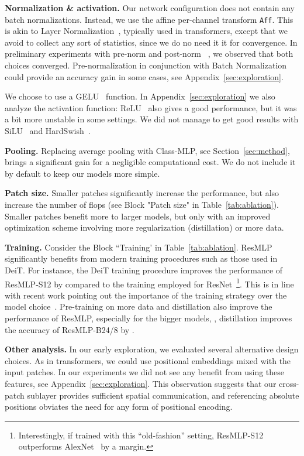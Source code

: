 \textbf{Normalization \& activation.}
Our network configuration does not contain any batch normalizations. 
Instead, we use the  affine per-channel transform \texttt{Aff}. 
This is akin to Layer Normalization~\cite{ba2016layer}, typically used in transformers, except that we avoid to collect any sort of statistics, since we do no need it it for convergence. 
In preliminary experiments with pre-norm and post-norm ~\cite{He2016IdentityMappings}, we observed that both choices converged.
Pre-normalization in conjunction with Batch Normalization could provide an accuracy gain in some cases, see Appendix~\ref{sec:exploration}.


We choose to use a GELU~\cite{Hendrycks2016GaussianEL} function. In Appendix~\ref{sec:exploration} we also analyze the activation function: 
ReLU~\cite{glorot11relu} also gives a good performance, but it was a bit more unstable in some settings. 
We did not manage to get good results with SiLU~\cite{Hendrycks2016GaussianEL} and HardSwish~\cite{Howard2019SearchingFM}. 

\textbf{Pooling.}  Replacing average pooling with Class-MLP, see Section~\ref{sec:method}, brings a significant gain for a negligible computational cost. We do not include it by default to keep our models more simple.  


\textbf{Patch size.} 
Smaller patches significantly increase the performance, but also increase the number of flops (see Block "Patch size" in Table~\ref{tab:ablation}).
Smaller patches benefit more to larger models, but only with an improved optimization scheme involving more regularization (distillation) or more data. 

\textbf{Training.} Consider the Block ``Training' in Table~\ref{tab:ablation}. ResMLP significantly benefits  from modern training procedures such as those used in DeiT. 
For instance, the DeiT training procedure improves the performance of ResMLP-S12 by  compared to the training employed for ResNet~\cite{He2016ResNet}\footnote{Interestingly, if trained with this ``old-fashion'' setting, ResMLP-S12 outperforms AlexNet~\cite{Krizhevsky2012AlexNet} by a margin. }. This is in line with recent work pointing out the importance of the training strategy over the model choice~\cite{Bello2021RevisitingRI,Radosavovic2020RegNet}.
Pre-training on more data and distillation also improve the performance of ResMLP, especially for the bigger models, \eg, distillation improves the accuracy of ResMLP-B24/8 by .



\textbf{Other analysis.} 
In our early exploration, we evaluated several alternative design choices. As in transformers, we could use positional embeddings mixed with the input patches. 
        In our experiments   we did not see any benefit from using these features, see Appendix~\ref{sec:exploration}.
        This observation suggests that our cross-patch sublayer provides sufficient spatial communication, and 
        referencing absolute positions obviates the need for any form of positional encoding.  


